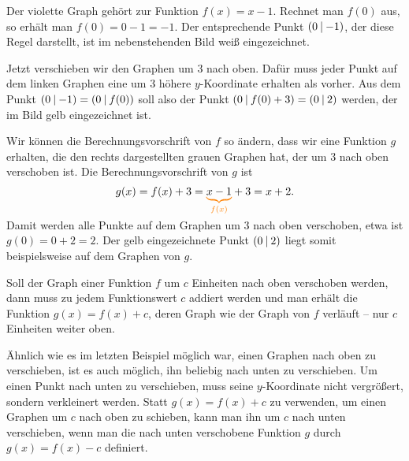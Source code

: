 \documentclass[../../main.tex]{subfiles}
\begin{document}
\begin{example}{}
    Der violette Graph gehört zur Funktion \mbox{$f(x)=x-1$}. Rechnet man $f(0)$ aus, so erhält man \mbox{$f(0)=0-1=-1$}. Der entsprechende Punkt $\left(0 \:\middle|\: -1\right)$, der diese Regel darstellt, ist im nebenstehenden Bild weiß eingezeichnet.
    
    Jetzt verschieben wir den Graphen um $3$ nach oben. Dafür muss jeder Punkt auf dem linken Graphen eine um $3$ höhere $y$-Koordinate erhalten als vorher. Aus dem Punkt $\left(0 \:\middle|\: -1\right)=\left(0 \:\middle|\: f(0)\right)$ soll also der Punkt $\left(0 \:\middle|\: f(0)+3\right)=\left(0 \:\middle|\: 2\right)$ werden, der im Bild gelb eingezeichnet ist.
    
    Wir können die Berechnungsvorschrift von $f$ so ändern, dass wir eine Funktion $g$ erhalten, die den rechts dargestellten grauen Graphen hat, der um $3$ nach oben verschoben ist. Die Berechnungsvorschrift von $g$ ist \[g(x)=f(x)+3=\colorbrace{x-1}{f(x)}+3=x+2.\] 
    Damit werden alle Punkte auf dem Graphen um $3$ nach oben verschoben, etwa ist $g(0)=0+2=2$. Der gelb eingezeichnete Punkt $\left(0 \:\middle|\: 2\right)$ liegt somit beispielsweise auf dem Graphen von $g$.
\end{example}

\sloppy
Soll der Graph einer Funktion $f$ um $c$ Einheiten nach oben verschoben werden, dann muss zu jedem Funktionswert $c$ addiert werden und man erhält die Funktion \mbox{$g(x)=f(x)+c$}, deren Graph wie der Graph von $f$ verläuft -- nur $c$ Einheiten weiter oben.

\fussy
Ähnlich wie es im letzten Beispiel möglich war, einen Graphen nach oben zu verschieben, ist es auch möglich, ihn beliebig nach unten zu verschieben. Um einen Punkt nach unten zu verschieben, muss seine $y$-Koordinate nicht vergrößert, sondern verkleinert werden. Statt $g(x)=f(x)+c$ zu verwenden, um einen Graphen um $c$ nach oben zu schieben, kann man ihn um $c$ nach unten verschieben, wenn man die nach unten verschobene Funktion $g$ durch $g(x)=f(x)-c$ definiert.
\end{document}

